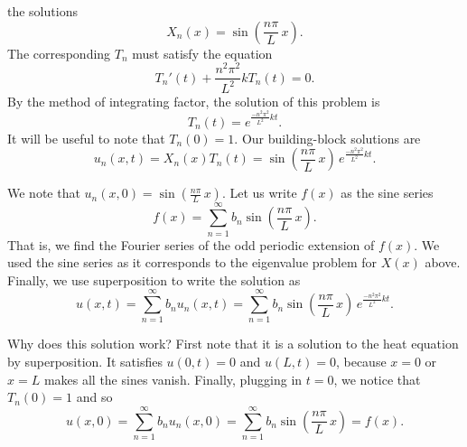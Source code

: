 \documentclass[12pt]{book}
\begin{document}
the solutions
\begin{equation*}
X_n (x) = \sin \left(\frac{n \pi}{L} \, x \right) .
\end{equation*}
The corresponding $T_n$ must satisfy the equation
\begin{equation*}
T_n'(t) + \frac{n^2 \pi^2}{L^2} k T_n(t) = 0 .
\end{equation*}
By the method of integrating factor, the solution of this problem is
\begin{equation*}
T_n(t) = e^{\frac{-n^2 \pi^2}{L^2} k t} .
\end{equation*}
It will be useful to note that $T_n(0) = 1$.
Our building-block solutions are
\begin{equation*}
u_n(x,t) = X_n(x)T_n(t) =
\sin \left( \frac{n \pi}{L} \, x \right)
\, e^{\frac{-n^2 \pi^2}{L^2} k t} .
\end{equation*}

We note that $u_n(x,0) = \sin \left( \frac{n \pi}{L} \, x \right)$.  Let us
write $f(x)$ as the sine series
\begin{equation*}
f(x) = \sum_{n=1}^\infty b_n \sin \left(\frac{n \pi}{L} \, x \right) .
\end{equation*}
That is, we find the Fourier series of the odd periodic extension of $f(x)$.
We used the sine series as it corresponds to the eigenvalue problem for
$X(x)$ above.
Finally, we use superposition to write the solution as
\begin{equation*}
\boxed{~~
u(x,t) = 
\sum_{n=1}^\infty
b_n
u_n(x,t)
=
\sum_{n=1}^\infty
b_n
\sin \left( \frac{n \pi}{L} \, x \right)
\, e^{\frac{-n^2 \pi^2}{L^2} k t} .
~~}
\end{equation*}

Why does this solution work?  First note that it is a solution to
the heat equation by superposition.  It satisfies $u(0,t) = 0$
and $u(L,t) = 0$, because $x=0$ or $x=L$ makes all the sines vanish.
Finally, plugging in $t=0$, we notice that $T_n(0) = 1$ and so
\begin{equation*}
u(x,0) = 
\sum_{n=1}^\infty
b_n
u_n(x,0)
=
\sum_{n=1}^\infty
b_n
\sin \left( \frac{n \pi}{L} \, x \right)
=
f(x) .
\end{equation*}
\end{document}
